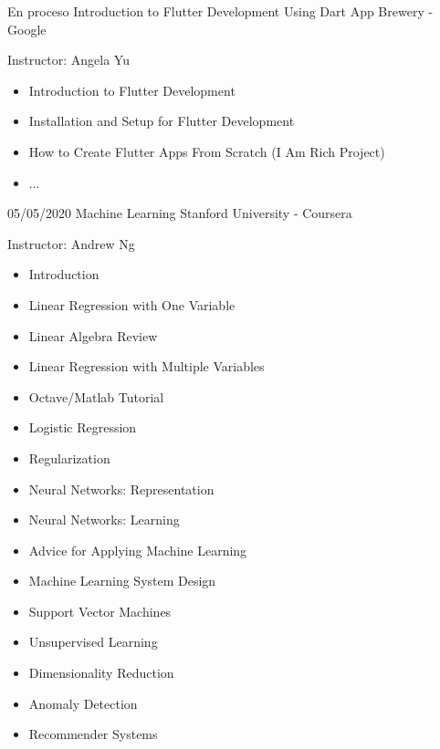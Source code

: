 \begin{entrylist}
    \entry
		{En proceso}
		{Introduction to Flutter Development Using Dart}
		{App Brewery - Google}
		{
		    Instructor: Angela Yu \\
		    \vspace{-5mm}
    	    \begin{itemize}
    	        \setlength\itemsep{0pt}
    	        \setlength\parskip{0pt}
    	        \item Introduction to Flutter Development
    	        \item Installation and Setup for Flutter Development
    	        \item How to Create Flutter Apps From Scratch (I Am Rich Project)
    	        \item ...
            \end{itemize}
		}
	\entry
		{05/05/2020}
		{Machine Learning}
		{Stanford University - Coursera}
		{
		    Instructor: Andrew Ng \\
		    \vspace{-5mm}
    	    \begin{itemize}
    	        \setlength\itemsep{0pt}
    	        \setlength\parskip{0pt}
    	        \item Introduction
    	        \item Linear Regression with One Variable
    	        \item Linear Algebra Review
    	        \item Linear Regression with Multiple Variables
    	        \item Octave/Matlab Tutorial
    	        \item Logistic Regression
    	        \item Regularization
    	        \item Neural Networks: Representation
    	        \item Neural Networks: Learning
    	        \item Advice for Applying Machine Learning
    	        \item Machine Learning System Design
    	        \item Support Vector Machines
    	        \item Unsupervised Learning
    	        \item Dimensionality Reduction
    	        \item Anomaly Detection
    	        \item Recommender Systems

\end{itemize}}
\end{entrylist}
